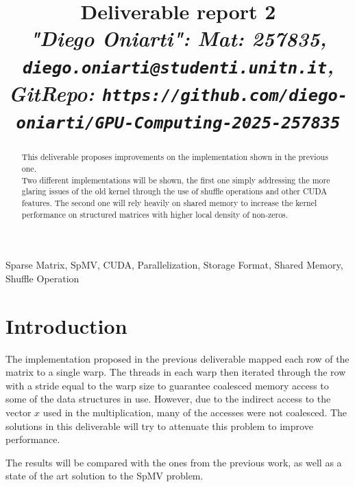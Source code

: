 \documentclass[conference]{IEEEtran}
\begin{document}
\author{}
\title{Deliverable report 2\\
\footnotesize \textit{"Diego Oniarti": Mat: 257835, \texttt{diego.oniarti@studenti.unitn.it}, GitRepo: \texttt{https://github.com/diego-oniarti/GPU-Computing-2025-257835}}}

\maketitle

\begin{abstract}
% 
    This deliverable proposes improvements on the implementation shown in the previous one.\\
    Two different implementations will be shown, the first one simply addressing the more glaring issues of the old kernel through the use of shuffle operations and other CUDA features. The second one will rely heavily on shared memory to increase the kernel performance on structured matrices with higher local density of non-zeros.
\end{abstract}

\begin{IEEEkeywords}
Sparse Matrix, SpMV, CUDA, Parallelization, Storage Format, Shared Memory, Shuffle Operation
\end{IEEEkeywords}

\section{Introduction}
The implementation proposed in the previous deliverable mapped each row of the matrix to a single warp. The threads in each warp then iterated through the row with a stride equal to the warp size to guarantee coalesced memory access to some of the data structures in use. However, due to the indirect access to the vector $x$ used in the multiplication, many of the accesses were not coalesced. The solutions in this deliverable will try to attenuate this problem to improve performance.

The results will be compared with the ones from the previous work, as well as a state of the art solution to the SpMV problem.
\end{document}
